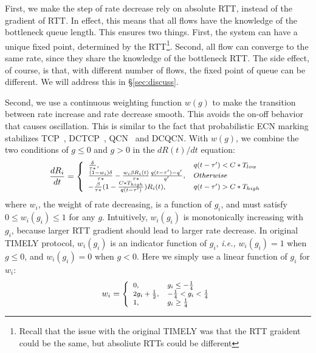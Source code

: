 First, we make the step of rate decrease rely on absolute RTT, instead of the
gradient of RTT. In effect, this means that all flows have the knowledge of the
bottleneck queue length.  This ensures two things. First, the system can have a
unique fixed point, determined by the RTT\footnote{Recall that the issue with
the original TIMELY was that the RTT graident could be the same, but absoliute
RTTs could be different}.  Second, all flow can converge to the same rate, since
they share the knowledge of the bottleneck RTT.  The side effect, of course, is
that, with different number of flows, the fixed point of queue can be different.
We will address this in \S\ref{sec:discuss}. 

Second, we use a continuous weighting function $w(g)$ to make the transition
between rate increase and rate decrease smooth. This avoids the on-off behavior
that causes oscillation.  This is similar to the fact that probabilistic ECN
marking stabilizes TCP~\cite{misra2000fluid}, DCTCP~\cite{dctcp-analysis},
QCN~\cite{qcn-analysis} and DCQCN. With $w(g)$, we combine the two conditions of
$g \le 0$ and $g>0$ in the $dR(t)/dt$ equation:
\begin{equation}
\small
\frac{{dR_i}}{{dt}} = \left\{ \begin{array}{ll}
\frac{\delta }{{\tau *}}, & q(t - \tau ') < C*{T_{low}}\\
\frac{{(1 - {w_i})\delta }}{{\tau *}} - \frac{{{w_i}\beta {R_i}(t)}}{{\tau *}}\frac{{q(t - \tau ') - q'}}{{q'}}, & Otherwise\\
 - \frac{\beta }{{\tau *}}(1 - \frac{{C*{T_{high}}}}{{q(t - \tau ')}})R_i(t), & q(t - \tau ') > C*{T_{high}}
\end{array} \right.\\
\label{eq:timely_fixed}
\end{equation}
where $w_i$, the weight of rate decreasing, is a function of $g_i$, and must satisfy $0 \le w_i(g_i) \le 1$ for any $g$. 
Intuitively, $w_i(g_i)$ is monotonically increasing with $g_i$, because larger RTT gradient should lead to larger 
rate decrease. In original TIMELY protocol, $w_i(g_i)$ is an indicator function of $g_i$, {\em i.e.,} 
$w_i(g_i)=1$ when $g \le 0$, and $w_i(g_i)=0$ when $g<0$. Here we simply use a linear function of $g_i$ for $w_i$:
\begin{equation}
\small
{w_i} = \left\{ \begin{array}{ll}
0, & {g_i \le  - \frac{1}{4}} \\
2{g_i} + \frac{1}{2}, & { - \frac{1}{4} < g_i < \frac{1}{4}} \\
1, & {g_i \ge \frac{1}{4}}
\end{array} \right.
\end{equation}
